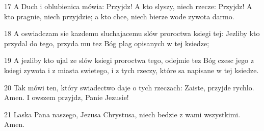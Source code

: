 \par 17 A Duch i oblubienica mówia: Przyjdz! A kto slyszy, niech rzecze: Przyjdz! A kto pragnie, niech przyjdzie; a kto chce, niech bierze wode zywota darmo.
\par 18 A oswiadczam sie kazdemu sluchajacemu slów proroctwa ksiegi tej: Jezliby kto przydal do tego, przyda mu tez Bóg plag opisanych w tej ksiedze;
\par 19 A jezliby kto ujal ze slów ksiegi proroctwa tego, odejmie tez Bóg czesc jego z ksiegi zywota i z miasta swietego, i z tych rzeczy, które sa napisane w tej ksiedze.
\par 20 Tak mówi ten, który swiadectwo daje o tych rzeczach: Zaiste, przyjde rychlo. Amen. I owszem przyjdz, Panie Jezusie!
\par 21 Laska Pana naszego, Jezusa Chrystusa, niech bedzie z wami wszystkimi. Amen.


